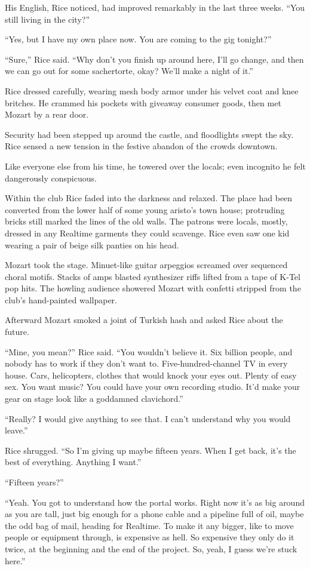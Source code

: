 His English, Rice noticed, had improved remarkably in the last three weeks. “You still living in the city?”

“Yes, but I have my own place now. You are coming to the gig tonight?”

“Sure,” Rice said. “Why don’t you finish up around here, I’ll go change, and then we can go out for some sachertorte, okay? We’ll make a night of it.”

Rice dressed carefully, wearing mesh body armor under his velvet coat and knee britches. He crammed his pockets with giveaway consumer goods, then met Mozart by a rear door.

Security had been stepped up around the castle, and floodlights swept the sky. Rice sensed a new tension in the festive abandon of the crowds downtown.

Like everyone else from his time, he towered over the locals; even incognito he felt dangerously conspicuous.

Within the club Rice faded into the darkness and relaxed. The place had been converted from the lower half of some young aristo’s town house; protruding bricks still marked the lines of the old walls. The patrons were locals, mostly, dressed in any Realtime garments they could scavenge. Rice even saw one kid wearing a pair of beige silk panties on his head.

Mozart took the stage. Minuet-like guitar arpeggios screamed over sequenced choral motifs. Stacks of amps blasted synthesizer riffs lifted from a tape of K-Tel pop hits. The howling audience showered Mozart with confetti stripped from the club’s hand-painted wallpaper.

Afterward Mozart smoked a joint of Turkish hash and asked Rice about the future.

“Mine, you mean?” Rice said. “You wouldn’t believe it. Six billion people, and nobody has to work if they don’t want to. Five-hundred-channel TV in every house. Cars, helicopters, clothes that would knock your eyes out. Plenty of easy sex. You want music? You could have your own recording studio. It’d make your gear on stage look like a goddamned clavichord.”

“Really? I would give anything to see that. I can’t understand why you would leave.”

Rice shrugged. “So I’m giving up maybe fifteen years. When I get back, it’s the best of everything. Anything I want.”

“Fifteen years?”

“Yeah. You got to understand how the portal works. Right now it’s as big around as you are tall, just big enough for a phone cable and a pipeline full of oil, maybe the odd bag of mail, heading for Realtime. To make it any bigger, like to move people or equipment through, is expensive as hell. So expensive they only do it twice, at the beginning and the end of the project. So, yeah, I guess we’re stuck here.”

